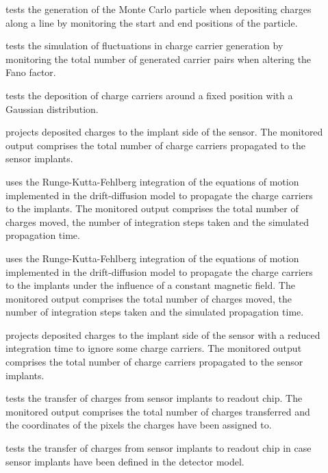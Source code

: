 \begin{description}
    \item[] tests the generation of the Monte Carlo particle when depositing charges along a line by monitoring the start and end positions of the particle.
    \item[] tests the simulation of fluctuations in charge carrier generation by monitoring the total number of generated carrier pairs when altering the Fano factor.
    \item[] tests the deposition of charge carriers around a fixed position with a Gaussian distribution.
    \item[] projects deposited charges to the implant side of the sensor. The monitored output comprises the total number of charge carriers propagated to the sensor implants.
    \item[] uses the Runge-Kutta-Fehlberg integration of the equations of motion implemented in the drift-diffusion model to propagate the charge carriers to the implants. The monitored output comprises the total number of charges moved, the number of integration steps taken and the simulated propagation time.
    \item[] uses the Runge-Kutta-Fehlberg integration of the equations of motion implemented in the drift-diffusion model to propagate the charge carriers to the implants under the influence of a constant magnetic field. The monitored output comprises the total number of charges moved, the number of integration steps taken and the simulated propagation time.
    \item[] projects deposited charges to the implant side of the sensor with a reduced integration time to ignore some charge carriers. The monitored output comprises the total number of charge carriers propagated to the sensor implants.
    \item[] tests the transfer of charges from sensor implants to readout chip. The monitored output comprises the total number of charges transferred and the coordinates of the pixels the charges have been assigned to.
    \item[] tests the transfer of charges from sensor implants to readout chip in case sensor implants have been defined in the detector model.

\end{description}
